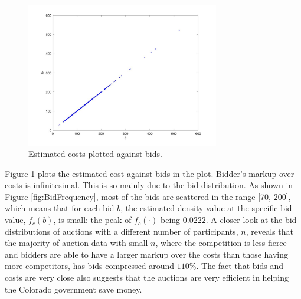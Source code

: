 \documentclass[11pt]{article}
\begin{document}
\begin{figure}
    \includegraphics[width=0.75\textwidth]{cost_bid.jpg}
    \centering
    \caption{Estimated costs plotted against bids.}
    \label{fig:cost_bid}
\end{figure}

Figure \ref{fig:cost_bid} plots the estimated cost against bids in the plot. 
Bidder's markup over costs is infinitesimal. This is so 
mainly due to the bid distribution. As shown in Figure \ref{fig:BidFrequency}, 
most of the bids are scattered in the range [70, 200], which means that for each 
bid $b$, the estimated density value at the specific bid value, $f_c(b)$, is 
small: the peak of $f_c(\cdot)$ being $0.0222$. A closer look at the bid 
distributions of auctions with a different number of participants, $n$, reveals 
that the majority of auction data with small $n$, where the competition is less 
fierce and bidders are able to have a larger markup over the costs than those 
having more competitors, has bids compressed around $110\%$. The fact 
that bids and costs are very close also suggests that the auctions are 
very efficient in helping the Colorado government save money. 
\end{document}
